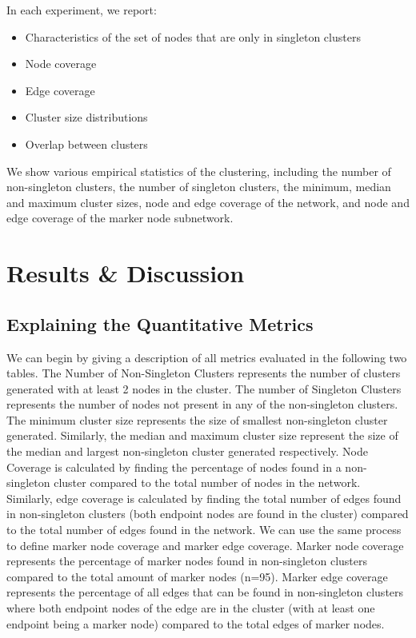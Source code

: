 \documentclass{article}
\begin{document}
In each experiment, we report:
\begin{itemize}
\item Characteristics of the set of nodes that are only in singleton clusters
\item Node coverage
\item Edge coverage
\item Cluster size distributions
\item Overlap between clusters
\end{itemize}

We show various empirical statistics of the clustering,  including the number of non-singleton clusters, the number of singleton clusters, the minimum, median and maximum cluster sizes,  node and edge coverage of the network, and node and edge coverage of the marker node subnetwork.


\section{Results \& Discussion}

\subsection{Explaining the Quantitative Metrics}
We can begin by giving a description of all metrics evaluated in the following two tables. The Number of Non-Singleton Clusters represents the number of clusters generated with at least 2 nodes in the cluster. The number of Singleton Clusters represents the number of nodes not present in any of the non-singleton clusters. The minimum cluster size represents the size of smallest non-singleton cluster generated. Similarly, the median and maximum cluster size represent the size of the median and largest non-singleton cluster generated respectively. Node Coverage is calculated by finding the percentage of nodes found in a non-singleton cluster compared to the total number of nodes in the network. Similarly, edge coverage is calculated by finding the total number of edges found in non-singleton clusters (both endpoint nodes are found in the cluster) compared to the total number of edges found in the network. We can use the same process to define marker node coverage and marker edge coverage. Marker node coverage represents the percentage of marker nodes found in non-singleton clusters compared to the total amount of marker nodes (n=95). Marker edge coverage represents the percentage of all edges that can be found in non-singleton clusters where both endpoint nodes of the edge are in the cluster (with at least one endpoint being a marker node) compared to the total edges of marker nodes. 
\newline
\end{document}
